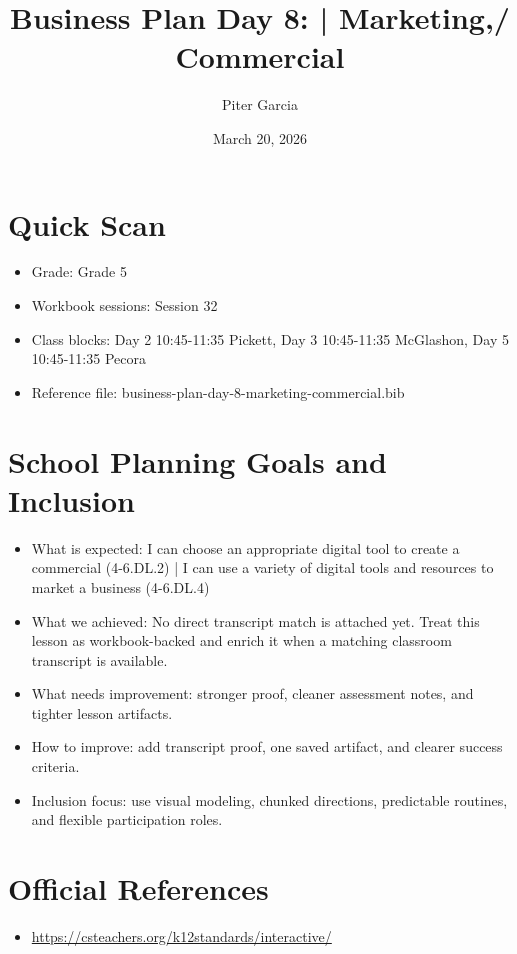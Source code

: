 \documentclass[11pt]{article}
\title{Business Plan Day 8: | Marketing,/ Commercial}
\author{Piter Garcia}
\date{March 20, 2026}
\begin{document}
\maketitle
\section*{Quick Scan}
\begin{itemize}[leftmargin=*]
\item Grade: Grade 5
\item Workbook sessions: Session 32
\item Class blocks: Day 2 10:45-11:35 Pickett, Day 3 10:45-11:35 McGlashon, Day 5 10:45-11:35 Pecora
\item Reference file: business-plan-day-8-marketing-commercial.bib
\end{itemize}
\section*{School Planning Goals and Inclusion}
\begin{itemize}[leftmargin=*]
\item What is expected: I can choose an appropriate digital tool to create a commercial (4-6.DL.2) | I can use a variety of digital tools and resources to market a business (4-6.DL.4)
\item What we achieved: No direct transcript match is attached yet. Treat this lesson as workbook-backed and enrich it when a matching classroom transcript is available.
\item What needs improvement: stronger proof, cleaner assessment notes, and tighter lesson artifacts.
\item How to improve: add transcript proof, one saved artifact, and clearer success criteria.
\item Inclusion focus: use visual modeling, chunked directions, predictable routines, and flexible participation roles.
\end{itemize}
\section*{Official References}
\begin{itemize}[leftmargin=*]
\item \url{https://csteachers.org/k12standards/interactive/}

\end{itemize}
\end{document}
